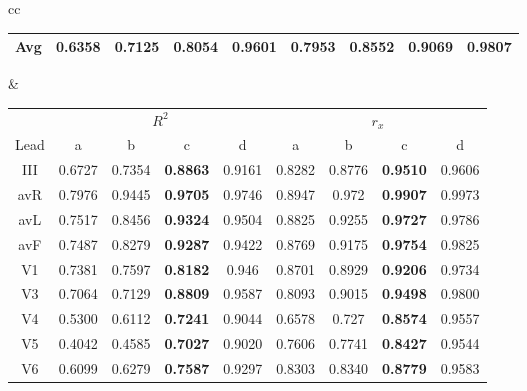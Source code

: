 \begin{table}[t!]
\begin{center}
\begin{tabular}{cc}
{\begin{footnotesize}
\begin{tabular}{|c|cccc|cccc|}
  \\

\hline

Avg & 0.6358 & 0.7125 & \textbf{0.8054} & 0.9601 & 0.7953 & 0.8552 & \textbf{0.9069} & 0.9807 \\

\hline
\end{tabular}
\end{footnotesize}
}
&
{
\begin{footnotesize}
\begin{tabular}{|c|cccc|cccc|}
\hline

\cline{2-9}
& \multicolumn{4}{c|}{$R^2$}
& \multicolumn{4}{c|}{$r_x$} \\
\cline{2-9}

Lead & a & b & c & d & a & b & c & d \\
\hline
III & 0.6727 & 0.7354 & \textbf{0.8863} & 0.9161 & 0.8282 & 0.8776 & \textbf{0.9510} & 0.9606
  \\

avR & 0.7976 & 0.9445 & \textbf{0.9705} & 0.9746 & 0.8947 & 0.972 & \textbf{0.9907} & 0.9973
  \\

avL & 0.7517 & 0.8456 & \textbf{0.9324} & 0.9504 & 0.8825 & 0.9255 & \textbf{0.9727} & 0.9786
  \\

avF & 0.7487 & 0.8279 & \textbf{0.9287} & 0.9422 & 0.8769 & 0.9175 & \textbf{0.9754} & 0.9825
  \\

V1 & 0.7381 & 0.7597 & \textbf{0.8182} & 0.946 & 0.8701 & 0.8929 & \textbf{0.9206} & 0.9734
  \\

V3 & 0.7064 & 0.7129 & \textbf{0.8809} & 0.9587 & 0.8093 & 0.9015 & \textbf{0.9498} & 0.9800
  \\

V4 & 0.5300 & 0.6112 & \textbf{0.7241} & 0.9044 & 0.6578 & 0.727 & \textbf{0.8574} & 0.9557
  \\

V5 & 0.4042 & 0.4585 & \textbf{0.7027} & 0.9020 & 0.7606 & 0.7741 & \textbf{0.8427} & 0.9544
  \\

V6 & 0.6099 & 0.6279 & \textbf{0.7587} & 0.9297 & 0.8303 & 0.8340 & \textbf{0.8779} & 0.9583
  \\

\hline


\end{tabular}
\end{footnotesize}}
\end{tabular}
\end{center}
\end{table}
